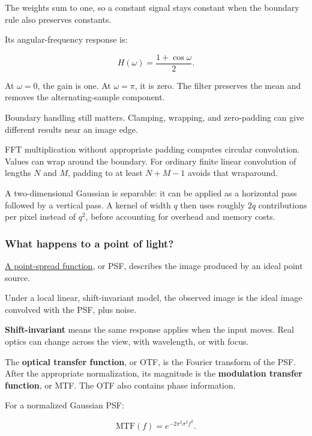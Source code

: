 The weights sum to one, so a constant signal stays constant when the boundary rule also preserves constants.

Its angular-frequency response is:

\[
H(\omega)=\frac{1+\cos\omega}{2}.
\]

At \(\omega=0\), the gain is one. At \(\omega=\pi\), it is zero. The filter preserves the mean and removes the alternating-sample component.

Boundary handling still matters. Clamping, wrapping, and zero-padding can give different results near an image edge.

FFT multiplication without appropriate padding computes circular convolution. Values can wrap around the boundary. For ordinary finite linear convolution of lengths \(N\) and \(M\), padding to at least \(N+M-1\) avoids that wraparound.

A two-dimensional Gaussian is separable: it can be applied as a horizontal pass followed by a vertical pass. A kernel of width \(q\) then uses roughly \(2q\) contributions per pixel instead of \(q^2\), before accounting for overhead and memory costs.

\subsubsection{What happens to a point of light?}\label{04-visual-computing-ii-ch043-what-happens-to-a-point-of-light}

\hypertarget{04-visual-computing-ii-ch043-what-happens-to-a-point-of-light}{}

\hyperref[appendix-8b76b0efd27f]{A point-spread function}, or PSF, describes the image produced by an ideal point source.

Under a local linear, shift-invariant model, the observed image is the ideal image convolved with the PSF, plus noise.

\textbf{Shift-invariant} means the same response applies when the input moves. Real optics can change across the view, with wavelength, or with focus.

The \textbf{optical transfer function}, or OTF, is the Fourier transform of the PSF. After the appropriate normalization, its magnitude is the \textbf{modulation transfer function}, or MTF. The OTF also contains phase information.

For a normalized Gaussian PSF:

\[
\mathrm{MTF}(f)=e^{-2\pi^2\sigma^2f^2}.
\]

